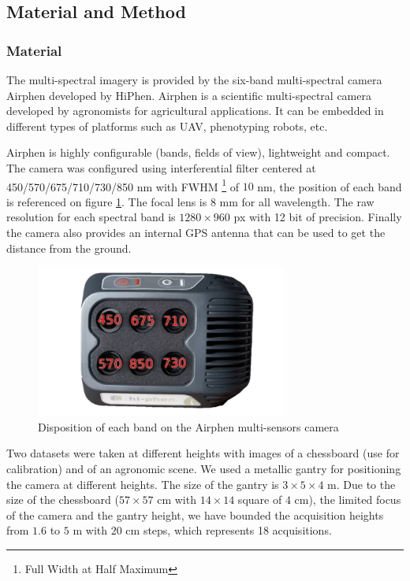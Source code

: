 \documentclass[../thesis.tex]{subfiles}
\begin{document}
	\subsection{Material and Method}
	
	\subsubsection{Material}
	
	The multi-spectral imagery is provided by the six-band multi-spectral camera Airphen developed by HiPhen.
	Airphen is a scientific multi-spectral camera developed by agronomists for agricultural applications.
	It can be embedded in different types of platforms such as UAV, phenotyping robots, etc.
	
	\par Airphen is highly configurable (bands, fields of view), lightweight and compact.
	The camera was configured using interferential filter centered at 450/570/675/710/730/850 nm
	with FWHM \footnote{Full Width at Half Maximum} of $10$ nm, the position of each band is referenced on figure \ref{fig:bands-disposition}.
	The focal lens is 8 mm for all wavelength. The raw resolution for each spectral band is $1280 \times 960$ px with 12 bit of precision.
	Finally the camera also provides an internal GPS antenna that can be used to get the distance from the ground.
	
	\begin{figure}[H]
		\centering
		\includegraphics[height=5cm]{img/registration/airphen-detail4}
		\caption{Disposition of each band on the Airphen multi-sensors camera}
		\label{fig:bands-disposition}
	\end{figure}
	
	\newpage
	\par Two datasets were taken at different heights with images of a chessboard (use for calibration) and of an agronomic scene.
	We used a metallic gantry for positioning the camera at different heights.
	The size of the gantry is $3\times5\times4$ m.
	Due to the size of the chessboard ($57\times57$ cm with $14\times14$ square of $4$ cm), the limited focus of the camera and the gantry height,
	we have bounded the acquisition heights from $1.6$ to $5$ m with $20$ cm steps, which represents 18 acquisitions.
	
\end{document}
